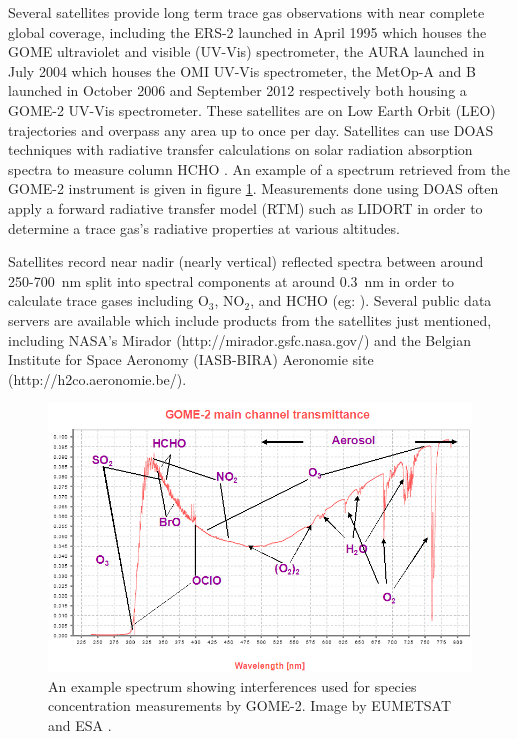     Several satellites provide long term trace gas observations with near complete global coverage, including the ERS-2 launched in April 1995 which houses the GOME ultraviolet and visible (UV-Vis) spectrometer, the AURA launched in July 2004 which houses the OMI UV-Vis spectrometer, the MetOp-A and B launched in October 2006 and September 2012 respectively both housing a GOME-2 UV-Vis spectrometer.
    These satellites are on Low Earth Orbit (LEO) trajectories and overpass any area up to once per day.
    Satellites can use DOAS techniques with radiative transfer calculations on solar radiation absorption spectra to measure column HCHO .
    An example of a spectrum retrieved from the GOME-2 instrument is given in figure \ref{LR:fig:gomeproducts}.
    Measurements done using DOAS often apply a forward radiative transfer model (RTM) such as LIDORT in order to determine a trace gas's radiative properties at various altitudes.
    
    Satellites record near nadir (nearly vertical) reflected spectra between around 250-700~nm split into spectral components at around $0.3$~nm in order to calculate trace gases including O$_3$, NO$_2$, and HCHO (eg: \citet{Leue2001}).
    Several public data servers are available which include products from the satellites just mentioned, including NASA's Mirador (http://mirador.gsfc.nasa.gov/) and the Belgian Institute for Space Aeronomy (IASB-BIRA) Aeronomie site (http://h2co.aeronomie.be/).
    
    \begin{figure}
      \includegraphics[width=\textwidth]{Figures/GOME_SPECTRUM.jpg}
      \caption{An example spectrum showing interferences used for species concentration measurements by GOME-2. Image by EUMETSAT and ESA \citep{GOME2Image}.}
      \label{LR:fig:gomeproducts}
    \end{figure}
    
